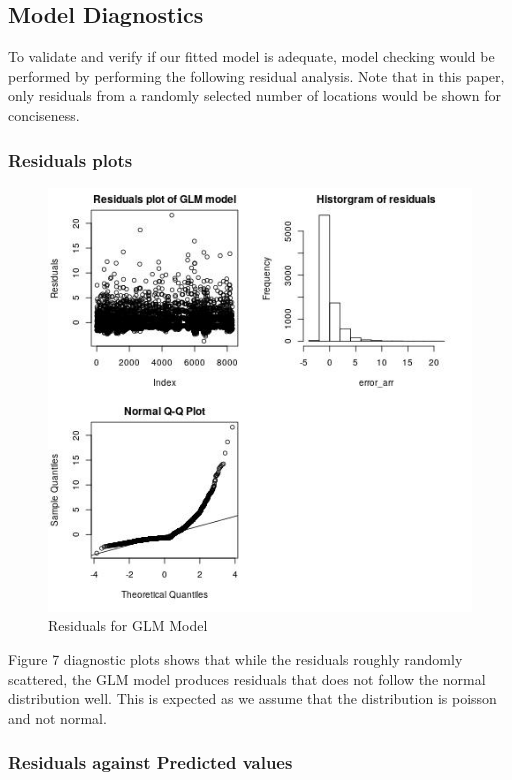 \documentclass[12pt, letterpaper] {article}
\begin{document}
\subsection{Model Diagnostics}
To validate and verify if our fitted model is adequate, model checking would be performed by performing the following residual analysis. Note that in this paper, only residuals from a randomly selected number of locations would be shown for conciseness. 	

\subsubsection{Residuals plots}

\begin{figure}[H]
    \centering
    \includegraphics[width=\textwidth, height=0.6\textheight]{Images/Full_GLM_resids.jpg}
    \caption{Residuals for GLM Model}
    \label{fig:Residuals for GLM Model}
\end{figure}

\noindent Figure 7 diagnostic plots shows that while the residuals roughly randomly scattered, the GLM model produces residuals that does not follow the normal distribution well. This is expected as we assume that the distribution is poisson and not normal. 

\subsubsection{Residuals against Predicted values}
\end{document}
